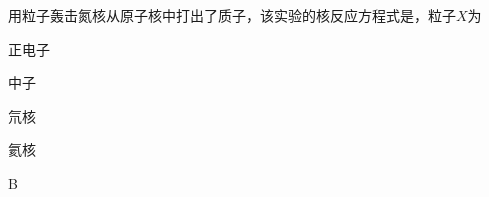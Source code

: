 用粒子轰击氮核从原子核中打出了质子，该实验的核反应方程式是，粒子\(X\)为\paren[]
\begin{choices}
	\item 正电子
	\item 中子
	\item 氘核
	\item 氦核
\end{choices}
\begin{answer}
	B
\end{answer}
